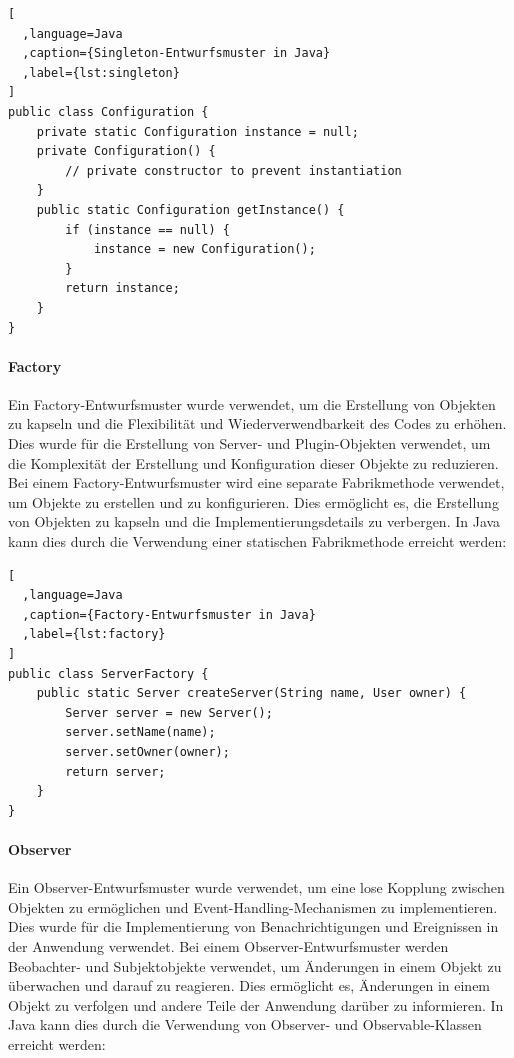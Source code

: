 \begin{lstlisting}[
  ,language=Java
  ,caption={Singleton-Entwurfsmuster in Java}
  ,label={lst:singleton}
]
public class Configuration {
    private static Configuration instance = null;
    private Configuration() {
        // private constructor to prevent instantiation
    }
    public static Configuration getInstance() {
        if (instance == null) {
            instance = new Configuration();
        }
        return instance;
    }
}
\end{lstlisting}

\paragraph{Factory}\label{factory} Ein Factory-Entwurfsmuster wurde verwendet, um die Erstellung von Objekten zu kapseln und die Flexibilität und Wiederverwendbarkeit des Codes zu erhöhen. Dies wurde für die Erstellung von Server- und Plugin-Objekten verwendet, um die Komplexität der Erstellung und Konfiguration dieser Objekte zu reduzieren. Bei einem Factory-Entwurfsmuster wird eine separate Fabrikmethode verwendet, um Objekte zu erstellen und zu konfigurieren. Dies ermöglicht es, die Erstellung von Objekten zu kapseln und die Implementierungsdetails zu verbergen. In Java kann dies durch die Verwendung einer statischen Fabrikmethode erreicht werden:

\begin{lstlisting}[
  ,language=Java
  ,caption={Factory-Entwurfsmuster in Java}
  ,label={lst:factory}
]
public class ServerFactory {
    public static Server createServer(String name, User owner) {
        Server server = new Server();
        server.setName(name);
        server.setOwner(owner);
        return server;
    }
}
\end{lstlisting}

\paragraph{Observer}\label{observer} Ein Observer-Entwurfsmuster wurde verwendet, um eine lose Kopplung zwischen Objekten zu ermöglichen und Event-Handling-Mechanismen zu implementieren. Dies wurde für die Implementierung von Benachrichtigungen und Ereignissen in der Anwendung verwendet. Bei einem Observer-Entwurfsmuster werden Beobachter- und Subjektobjekte verwendet, um Änderungen in einem Objekt zu überwachen und darauf zu reagieren. Dies ermöglicht es, Änderungen in einem Objekt zu verfolgen und andere Teile der Anwendung darüber zu informieren. In Java kann dies durch die Verwendung von Observer- und Observable-Klassen erreicht werden:

